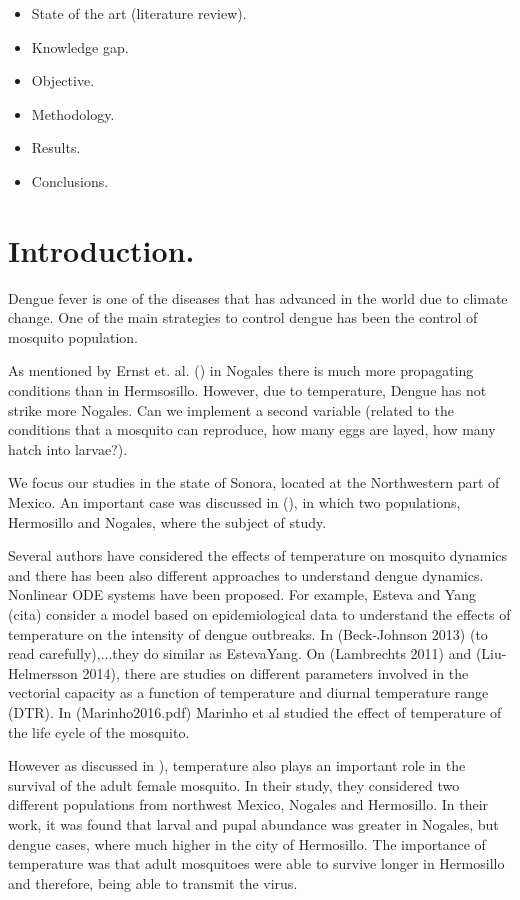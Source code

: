 \begin{itemize}
	\item
    	State of the art (literature review).
    \item	
    	Knowledge gap.
    \item	
    	Objective.
    \item
    	Methodology.
    \item	
    	Results.
    \item
    	Conclusions.
\end{itemize}


\section{Introduction.}\label{intro}
	Dengue fever is one of the diseases that has advanced in the 
world due to climate change. One of the main strategies to control dengue has been the control of mosquito population.

	As mentioned by Ernst et. al. (\cite{Ernst2016}) in Nogales there 
is much more propagating conditions than in Hermsosillo. However, 
due to temperature, Dengue has not strike more Nogales. Can we 
implement a second variable (related to the conditions that a 
mosquito can reproduce, how many eggs are layed, how many hatch into larvae?).

\noindent We focus our studies in the state of Sonora, located at the Northwestern part of Mexico. An important case was discussed in (\cite{Ernst2016}), in which two populations, Hermosillo and Nogales, where the subject of study.

\noindent Several authors have considered the effects of temperature on mosquito dynamics and there has been also different approaches to understand dengue dynamics. Nonlinear ODE systems have been proposed. For example, Esteva and Yang (cita) consider a model based on epidemiological data to understand the effects of temperature on the intensity of dengue outbreaks. In (Beck-Johnson 2013) (to read carefully),...they do similar as EstevaYang. On (Lambrechts 2011) and (Liu-Helmersson 2014), there are studies on different parameters involved in the vectorial capacity as a function of temperature and diurnal temperature range (DTR). In (Marinho2016.pdf) Marinho et al studied the effect of temperature of the life cycle of the mosquito.


\noindent However as discussed in \cite{Ernst2016}), temperature also plays an important role in the survival of the adult female mosquito. In their study, they considered two different populations from northwest Mexico, Nogales and Hermosillo. In their work, it was found that larval and pupal abundance was greater in Nogales, but dengue cases, where much higher in the city of Hermosillo. The importance of temperature was that adult mosquitoes were able to survive longer in Hermosillo and therefore, being able to transmit the virus.

